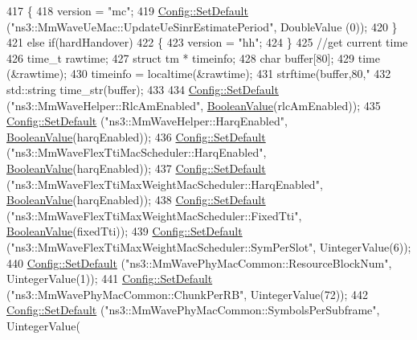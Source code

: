\begin{DoxyCode}
417   \{
418     version = \textcolor{stringliteral}{"mc"};
419     \hyperlink{group__config_ga2e7882df849d8ba4aaad31c934c40c06}{Config::SetDefault} (\textcolor{stringliteral}{"ns3::MmWaveUeMac::UpdateUeSinrEstimatePeriod"}, DoubleValue (0));
420   \}
421   \textcolor{keywordflow}{else} \textcolor{keywordflow}{if}(hardHandover)
422   \{
423     version = \textcolor{stringliteral}{"hh"};
424   \}
425   \textcolor{comment}{//get current time}
426   time\_t rawtime;
427   \textcolor{keyword}{struct }tm * timeinfo;
428   \textcolor{keywordtype}{char} buffer[80];
429   time (&rawtime);
430   timeinfo = localtime(&rawtime);
431   strftime(buffer,80,\textcolor{stringliteral}{"%
432   std::string time\_str(buffer);
433 
434   \hyperlink{group__config_ga2e7882df849d8ba4aaad31c934c40c06}{Config::SetDefault} (\textcolor{stringliteral}{"ns3::MmWaveHelper::RlcAmEnabled"}, 
      \hyperlink{classns3_1_1BooleanValue}{BooleanValue}(rlcAmEnabled));
435   \hyperlink{group__config_ga2e7882df849d8ba4aaad31c934c40c06}{Config::SetDefault} (\textcolor{stringliteral}{"ns3::MmWaveHelper::HarqEnabled"}, 
      \hyperlink{classns3_1_1BooleanValue}{BooleanValue}(harqEnabled));
436   \hyperlink{group__config_ga2e7882df849d8ba4aaad31c934c40c06}{Config::SetDefault} (\textcolor{stringliteral}{"ns3::MmWaveFlexTtiMacScheduler::HarqEnabled"}, 
      \hyperlink{classns3_1_1BooleanValue}{BooleanValue}(harqEnabled));
437   \hyperlink{group__config_ga2e7882df849d8ba4aaad31c934c40c06}{Config::SetDefault} (\textcolor{stringliteral}{"ns3::MmWaveFlexTtiMaxWeightMacScheduler::HarqEnabled"}, 
      \hyperlink{classns3_1_1BooleanValue}{BooleanValue}(harqEnabled));
438   \hyperlink{group__config_ga2e7882df849d8ba4aaad31c934c40c06}{Config::SetDefault} (\textcolor{stringliteral}{"ns3::MmWaveFlexTtiMaxWeightMacScheduler::FixedTti"}, 
      \hyperlink{classns3_1_1BooleanValue}{BooleanValue}(fixedTti));
439   \hyperlink{group__config_ga2e7882df849d8ba4aaad31c934c40c06}{Config::SetDefault} (\textcolor{stringliteral}{"ns3::MmWaveFlexTtiMaxWeightMacScheduler::SymPerSlot"}, 
      UintegerValue(6));
440   \hyperlink{group__config_ga2e7882df849d8ba4aaad31c934c40c06}{Config::SetDefault} (\textcolor{stringliteral}{"ns3::MmWavePhyMacCommon::ResourceBlockNum"}, UintegerValue(1));
441   \hyperlink{group__config_ga2e7882df849d8ba4aaad31c934c40c06}{Config::SetDefault} (\textcolor{stringliteral}{"ns3::MmWavePhyMacCommon::ChunkPerRB"}, UintegerValue(72));
442   \hyperlink{group__config_ga2e7882df849d8ba4aaad31c934c40c06}{Config::SetDefault} (\textcolor{stringliteral}{"ns3::MmWavePhyMacCommon::SymbolsPerSubframe"}, UintegerValue(
}
\end{DoxyCode}
